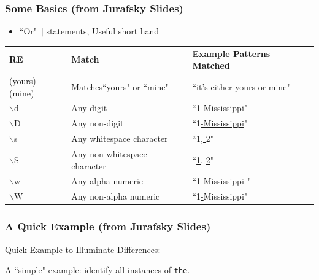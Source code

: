 \documentclass{beamer}
\begin{document}
\begin{frame}
\frametitle{Some Basics (from Jurafsky Slides) } 
\begin{itemize}
\item ``Or"~$|$ statements, Useful short hand 
\end{itemize}
\begin{center}
\scriptsize
\begin{tabular}{lll}
\textbf{RE} & \textbf{Match} & \textbf{Example Patterns Matched}\\
(yours)$|$(mine) & Matches``yours" or ``mine" & ``it's either \underline{yours} or \underline{mine}"\\
$\backslash$d  & Any digit  & ``\underline{1}-Mississippi" \\
$\backslash$D  & Any non-digit & ``1\underline{-Mississippi}" \\
$\backslash$s & Any whitespace character & ``1,\underline{ }2"\\
$\backslash$S & Any non-whitespace character & ``\underline{1,} \underline{2}" \\
$\backslash$w & Any alpha-numeric  &  ``\underline{1}-\underline{Mississippi} " \\
$\backslash$W & Any non-alpha numeric & ``1\underline{-}Mississippi"  \\
\end{tabular}
\end{center}
\end{frame}

\begin{frame}
\frametitle{A Quick Example (from Jurafsky Slides) } 
Quick Example to Illuminate Differences: 

A ``simple" example: identify all instances of \alert{{\tt the}}. \pause 

\begin{itemize}
 \pause 
{} \pause 
{} \pause 
{} \pause 
{} \pause 
{} \pause 
{} 
\end{itemize}
\end{frame}
\end{document}
